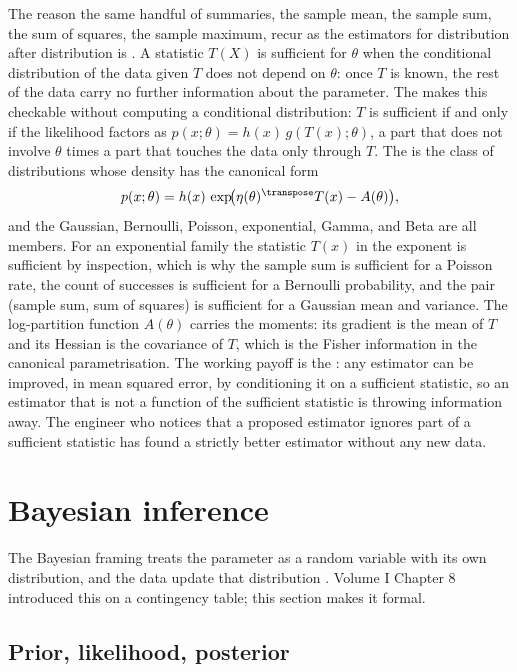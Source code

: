 \begin{mastery}
The reason the same handful of summaries, the sample mean, the sample
sum, the sum of squares, the sample maximum, recur as the estimators
for distribution after distribution is . A
statistic $T(X)$ is sufficient for $\theta$ when the conditional
distribution of the data given $T$ does not depend on $\theta$: once
$T$ is known, the rest of the data carry no further information about
the parameter. The  makes this
checkable without computing a conditional distribution: $T$ is
sufficient if and only if the likelihood factors as $p(x; \theta) =
h(x)\, g(T(x); \theta)$, a part that does not involve $\theta$ times
a part that touches the data only through $T$. The  is the class of distributions whose density has the canonical
form
\[
p(x; \theta) = h(x)\, \exp\!\bigl(\eta(\theta)^{\transpose} T(x)
- A(\theta)\bigr),
\]
and the Gaussian, Bernoulli, Poisson, exponential, Gamma, and Beta
are all members. For an exponential family the statistic $T(x)$ in
the exponent is sufficient by inspection, which is why the sample sum
is sufficient for a Poisson rate, the count of successes is
sufficient for a Bernoulli probability, and the pair (sample sum,
sum of squares) is sufficient for a Gaussian mean and variance. The
log-partition function $A(\theta)$ carries the moments: its gradient
is the mean of $T$ and its Hessian is the covariance of $T$, which is
the Fisher information in the canonical parametrisation. The working
payoff is the : any estimator can be
improved, in mean squared error, by conditioning it on a sufficient
statistic, so an estimator that is not a function of the sufficient
statistic is throwing information away. The engineer who notices that
a proposed estimator ignores part of a sufficient statistic has found
a strictly better estimator without any new data.
\end{mastery}

\section{Bayesian inference}

The Bayesian framing treats the parameter as a random variable with
its own distribution, and the data update that distribution
\cite[ch.~11]{text:wasserman2004}. Volume I Chapter 8 introduced
this on a contingency table; this section makes it formal.

\subsection{Prior, likelihood, posterior}

